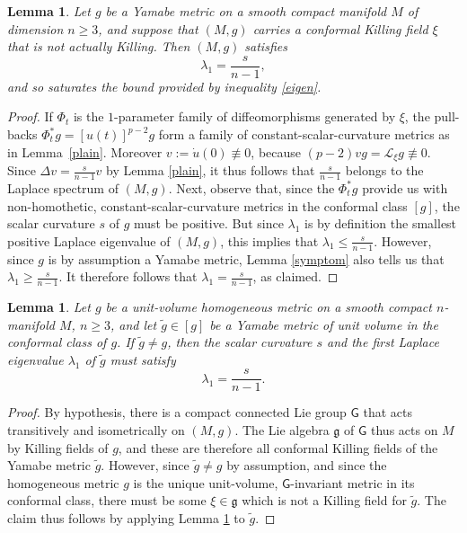 \documentclass[pdftex]{sigma}
\numberwithin{equation}{section}
\newtheorem{Lemma}[Theorem]{Lemma}
\begin{document}
\begin{Lemma} \label{evident}
Let $g$ be a Yamabe metric on a smooth compact manifold $M$ of dimension $n\geq 3$, and suppose
that $(M,g)$ carries a {conformal} Killing field $\xi$ that is {not} actually Killing. Then $(M,g)$ satisfies
\begin{equation*}
\lambda_1 = \frac{s}{n-1},
\end{equation*}
and so saturates the bound provided by inequality \eqref{eigen}.
\end{Lemma}
\begin{proof} If $\Phi_t$ is the $1$-parameter family of diffeomorphisms generated by $\xi$, the pull-backs $ \Phi_t^*g= [u (t)]^{p-2}g$
 form a family of constant-scalar-curvature metrics as in Lemma~\ref{plain}. Moreover
 $v:= \dot{u}(0)\not\equiv 0$, because $(p-2) vg= \mathscr{L}_\xi g\not\equiv 0$.
Since $\Delta v = \frac{s}{n-1} v$ by Lemma \ref{plain}, it thus follows that
$\frac{s}{n-1}$ belongs to the Laplace spectrum of $(M,g)$. Next, observe that, since the $\Phi_t^*g$ provide us with non-homothetic,
 constant-scalar-curvature
metrics in the conformal class $[g]$, the scalar curvature $s$ of $g$ must be positive. But since
$\lambda_1$ is by definition the smallest positive Laplace eigenvalue of $(M,g)$, this implies that $\lambda_1 \leq \frac{s}{n-1}$.
However, since $g$ is by assumption a Yamabe metric, Lemma \ref{symptom} also tells us that
$\lambda_1 \geq \frac{s}{n-1}$.
It therefore follows that $\lambda_1 = \frac{s}{n-1}$, as claimed.
\end{proof}

\begin{Lemma}\label{test}
 Let ${g}$ be a unit-volume homogeneous metric on a smooth compact $n$-manifold $M$, $n\geq 3$, and let
 $\tilde{g}\in [{g}]$ be a Yamabe metric of unit volume in the conformal class of ${g}$. If $\tilde{g}\neq {g}$, then the scalar curvature $s$
 and the first Laplace eigenvalue $\lambda_1$ of $\tilde{g}$ must satisfy
 \begin{equation*}
 \lambda_1 = \frac{s}{n-1}.
\end{equation*}
 \end{Lemma}
\begin{proof} By hypothesis, there is a compact connected Lie group $\mathsf{G}$ that acts transitively and isometrically on $(M, {g})$.
The Lie algebra $\mathfrak{g}$ of $\mathsf{G}$ thus acts on $M$ by Killing fields of ${g}$, and these are therefore all conformal Killing fields of
the Yamabe metric $\tilde{g}$. However, since $\tilde{g}\neq {g}$ by assumption, and since the homogeneous metric ${g}$ is the unique unit-volume,
$\mathsf{G}$-invariant metric in its conformal class, there must be some $\xi \in \mathfrak{g}$ which is not
a Killing field for $\tilde{g}$. The claim thus follows by applying Lemma \ref{evident} to $\tilde{g}$. \end{proof}
\end{document}
